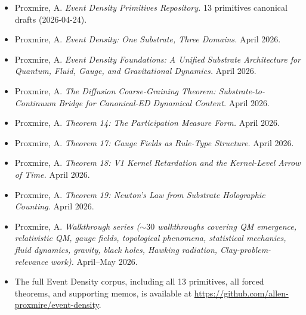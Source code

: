 \documentclass[11pt,a4paper]{article}
\begin{document}
\begin{itemize}[noitemsep]
\item Proxmire, A. \textit{Event Density Primitives Repository.} 13 primitives canonical drafts (2026-04-24).
\item Proxmire, A. \textit{Event Density: One Substrate, Three Domains.} April 2026.
\item Proxmire, A. \textit{Event Density Foundations: A Unified Substrate Architecture for Quantum, Fluid, Gauge, and Gravitational Dynamics.} April 2026.
\item Proxmire, A. \textit{The Diffusion Coarse-Graining Theorem: Substrate-to-Continuum Bridge for Canonical-ED Dynamical Content.} April 2026.
\item Proxmire, A. \textit{Theorem 14: The Participation Measure Form.} April 2026.
\item Proxmire, A. \textit{Theorem 17: Gauge Fields as Rule-Type Structure.} April 2026.
\item Proxmire, A. \textit{Theorem 18: V1 Kernel Retardation and the Kernel-Level Arrow of Time.} April 2026.
\item Proxmire, A. \textit{Theorem 19: Newton's Law from Substrate Holographic Counting.} April 2026.
\item Proxmire, A. \textit{Walkthrough series ($\sim 30$ walkthroughs covering QM emergence, relativistic QM, gauge fields, topological phenomena, statistical mechanics, fluid dynamics, gravity, black holes, Hawking radiation, Clay-problem-relevance work).} April--May 2026.
\item The full Event Density corpus, including all 13 primitives, all forced theorems, and supporting memos, is available at \url{https://github.com/allen-proxmire/event-density}.
\end{itemize}
\end{document}
